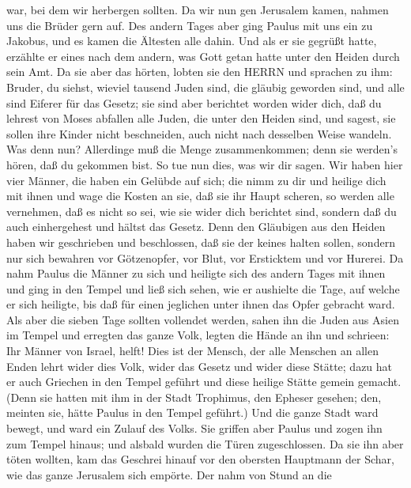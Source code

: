 war, bei dem wir herbergen sollten.  Da wir nun gen
Jerusalem kamen, nahmen uns die Brüder gern auf.  Des
andern Tages aber ging Paulus mit uns ein zu Jakobus, und es kamen die
Ältesten alle dahin.  Und als er sie gegrüßt hatte,
erzählte er eines nach dem andern, was Gott getan hatte unter den Heiden
durch sein Amt.  Da sie aber das hörten, lobten sie den
HERRN und sprachen zu ihm: Bruder, du siehst, wieviel tausend Juden
sind, die gläubig geworden sind, und alle sind Eiferer für das Gesetz;
 sie sind aber berichtet worden wider dich, daß du lehrest
von Moses abfallen alle Juden, die unter den Heiden sind, und sagest,
sie sollen ihre Kinder nicht beschneiden, auch nicht nach desselben
Weise wandeln.  Was denn nun? Allerdinge muß die Menge
zusammenkommen; denn sie werden's hören, daß du gekommen bist.
 So tue nun dies, was wir dir sagen.  Wir
haben hier vier Männer, die haben ein Gelübde auf sich; die nimm zu dir
und heilige dich mit ihnen und wage die Kosten an sie, daß sie ihr Haupt
scheren, so werden alle vernehmen, daß es nicht so sei, wie sie wider
dich berichtet sind, sondern daß du auch einhergehest und hältst das
Gesetz.  Denn den Gläubigen aus den Heiden haben wir
geschrieben und beschlossen, daß sie der keines halten sollen, sondern
nur sich bewahren vor Götzenopfer, vor Blut, vor Ersticktem und vor
Hurerei.  Da nahm Paulus die Männer zu sich und heiligte
sich des andern Tages mit ihnen und ging in den Tempel und ließ sich
sehen, wie er aushielte die Tage, auf welche er sich heiligte, bis daß
für einen jeglichen unter ihnen das Opfer gebracht ward. 
Als aber die sieben Tage sollten vollendet werden, sahen ihn die Juden
aus Asien im Tempel und erregten das ganze Volk, legten die Hände an ihn
und schrieen:  Ihr Männer von Israel, helft! Dies ist der
Mensch, der alle Menschen an allen Enden lehrt wider dies Volk, wider
das Gesetz und wider diese Stätte; dazu hat er auch Griechen in den
Tempel geführt und diese heilige Stätte gemein gemacht. 
(Denn sie hatten mit ihm in der Stadt Trophimus, den Epheser gesehen;
den, meinten sie, hätte Paulus in den Tempel geführt.)  Und
die ganze Stadt ward bewegt, und ward ein Zulauf des Volks. Sie griffen
aber Paulus und zogen ihn zum Tempel hinaus; und alsbald wurden die
Türen zugeschlossen.  Da sie ihn aber töten wollten, kam
das Geschrei hinauf vor den obersten Hauptmann der Schar, wie das ganze
Jerusalem sich empörte.  Der nahm von Stund an die
